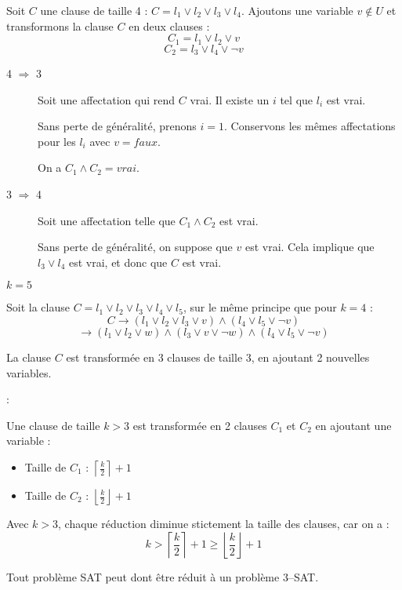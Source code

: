 \begin{enumerate}[(a)]
\begin{description}
Soit $C$ une clause de taille 4 : $C = l_1 \vee l_2 \vee l_3 \vee l_4$.
Ajoutons une variable $v \notin U$ et transformons la clause $C$ en deux clauses :
\[ C_1 = l_1 \vee l_2 \vee v \]
\[ C_2 = l_3 \vee l_4 \vee \neg v \]
\begin{description}
\item [4 $\Rightarrow$ 3]
Soit une affectation qui rend $C$ vrai. Il existe un $i$ tel que $l_i$ est vrai.

Sans perte de généralité, prenons $i = 1$. Conservons les mêmes affectations pour les $l_i$ avec $v = faux$.

On a $C_1 \wedge C_2 = vrai$.
\item [3 $\Rightarrow$ 4]
Soit une affectation telle que $C_1 \wedge C_2$ est vrai.

Sans perte de généralité, on suppose que $v$ est vrai. Cela implique que $l_3 \vee l_4$ est vrai, et donc que $C$ est vrai.
\end{description}

\item {} $k = 5$ 

Soit la clause $C = l_1 \vee l_2 \vee l_3 \vee l_4 \vee l_5$, sur le même principe que pour $k = 4$ :
\[C \rightarrow (l_1 \vee l_2 \vee l_3 \vee v) \wedge (l_4 \vee l_5 \vee \neg v) \]
\[\rightarrow (l_1 \vee l_2 \vee w) \wedge (l_3 \vee v \vee \neg w) \wedge (l_4 \vee l_5 \vee \neg v)\]

La clause $C$ est transformée en 3 clauses de taille 3, en ajoutant 2 nouvelles variables.

\item [Généralisation] :

Une clause de taille $k > 3$ est transformée en 2 clauses $C_1$ et $C_2$ en ajoutant une variable :
\begin{itemize}
\item Taille de $C_1$ : $\left \lceil \frac{k}{2} \right \rceil + 1$
\item Taille de $C_2$ : $\left \lfloor \frac{k}{2} \right \rfloor + 1$
\end{itemize}
Avec $k > 3$, chaque réduction diminue stictement la taille des clauses, car on a : \[ k > \left \lceil \frac{k}{2} \right \rceil + 1 \geq \left \lfloor \frac{k}{2} \right \rfloor + 1 \]

Tout problème SAT peut dont être réduit à un problème 3--SAT.

\end{description}


\end{enumerate}
